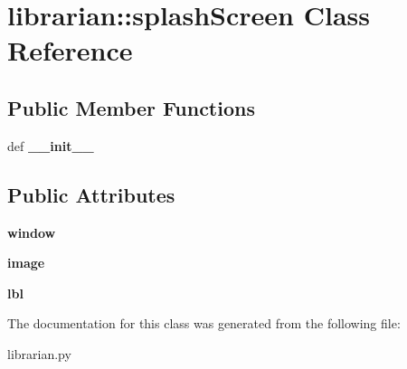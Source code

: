 \hypertarget{classlibrarian_1_1splashScreen}{
\section{librarian::splashScreen Class Reference}
\label{classlibrarian_1_1splashScreen}
}
\subsection*{Public Member Functions}
\begin{DoxyCompactItemize}
\item 
\hypertarget{classlibrarian_1_1splashScreen_aab1f0deca3a39e72ee0071f30e99fddf}{
def {\bfseries \_\-\_\-init\_\-\_\-}}
\label{classlibrarian_1_1splashScreen_aab1f0deca3a39e72ee0071f30e99fddf}

\end{DoxyCompactItemize}
\subsection*{Public Attributes}
\begin{DoxyCompactItemize}
\item 
\hypertarget{classlibrarian_1_1splashScreen_ab86acc90ddb7d0566ec8a0f6af0e3a05}{
{\bfseries window}}
\label{classlibrarian_1_1splashScreen_ab86acc90ddb7d0566ec8a0f6af0e3a05}

\item 
\hypertarget{classlibrarian_1_1splashScreen_a9bc44e4da9ecd67a9ba6f3ff5c3309ff}{
{\bfseries image}}
\label{classlibrarian_1_1splashScreen_a9bc44e4da9ecd67a9ba6f3ff5c3309ff}

\item 
\hypertarget{classlibrarian_1_1splashScreen_aedccf5a64ce11356aee85134c4e66334}{
{\bfseries lbl}}
\label{classlibrarian_1_1splashScreen_aedccf5a64ce11356aee85134c4e66334}

\end{DoxyCompactItemize}


The documentation for this class was generated from the following file:\begin{DoxyCompactItemize}
\item 
librarian.py\end{DoxyCompactItemize}
